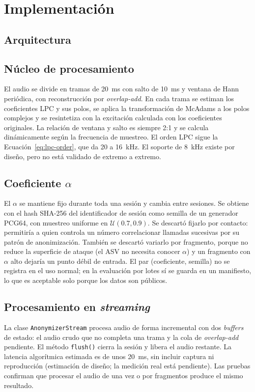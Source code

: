 \section{Implementación}

\subsection{Arquitectura}


\subsection{Núcleo de procesamiento}
El audio se divide en tramas de 20~ms con salto de 10~ms y ventana de Hann periódica, 
con reconstrucción por \textit{overlap-add}. En cada trama se estiman los coeficientes 
LPC y sus polos, se aplica la transformación de McAdams a los polos complejos y se resintetiza 
con la excitación calculada con los coeficientes originales. La relación de ventana y salto es 
siempre 2:1 y se calcula dinámicamente según la frecuencia de muestreo. El orden LPC sigue la 
Ecuación~\eqref{eq:lpc-order}, que da 20 a 16~kHz. El soporte de 8~kHz existe 
por diseño, pero no está validado de extremo a extremo.

\subsection{Coeficiente \texorpdfstring{$\alpha$}{alfa}}
El $\alpha$ se mantiene fijo durante toda una sesión y cambia entre sesiones. 
Se obtiene con el hash SHA-256 del identificador de sesión como semilla de un generador PCG64, 
con muestreo uniforme en $\mathcal{U}(0.7,0.9)$. Se descartó fijarlo por contacto: permitiría 
a quien controla un número correlacionar llamadas sucesivas por su patrón de anonimización. 
También se descartó variarlo por fragmento, porque no reduce la superficie de ataque 
(el ASV no necesita conocer $\alpha$) y un fragmento con $\alpha$ alto dejaría un punto débil de entrada. 
El par (coeficiente, semilla) no se registra en el uso normal; en la evaluación por lotes sí se guarda en 
un manifiesto, lo que es aceptable solo porque los datos son públicos.

\subsection{Procesamiento en \textit{streaming}}
La clase \texttt{AnonymizerStream} procesa audio de forma incremental con dos \textit{buffers} de estado: 
el audio crudo que no completa una trama y la cola de \textit{overlap-add} pendiente. El método \texttt{flush()} 
cierra la sesión y libera el audio restante. La latencia algorítmica estimada es de unos 20~ms, sin incluir 
captura ni reproducción (estimación de diseño; la medición real está pendiente). Las pruebas confirman que 
procesar el audio de una vez o por fragmentos produce el mismo resultado.

